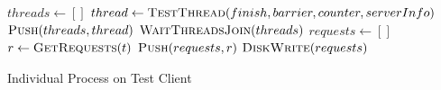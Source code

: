 \begin{algorithm}[ht!]
	\begin{algorithmic}
		\State $threads\gets[]$
		\State $thread\gets\Call{TestThread}{finish,barrier,counter,serverInfo}$
		\State $\Call{Push}{threads, thread}$
		\EndFor
		\State $\Call{WaitThreadsJoin}{threads}$
		\State $requests\gets[]$
		\State $r\gets\Call{GetRequests}{t}$
		\State $\Call{Push}{requests, r}$
		\EndFor
		\State $\Call{DiskWrite}{requests}$
		\EndProcedure
	\end{algorithmic}
	\caption{Individual Process on Test Client}
	\label{algo:testClientProcess}
\end{algorithm}
